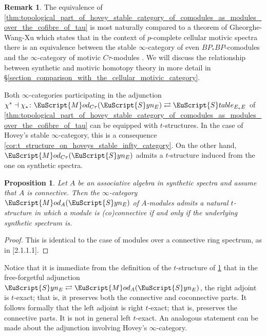 \documentclass[oneside,a4paper]{amsart}
\newcommand{\euscr}[1]{\EuScript{#1}} %
\newcommand{\stableE}{\euscr{S}table_{E_{*}E}} %
\newcommand{\synspectra}{\euscr{S}yn} %
\newcommand{\Mod}{\euscr{M}od} %
\theoremstyle{plain}
\newtheorem{prop}[thm]{Proposition}
\theoremstyle{definition}
\newtheorem{rem}[thm]{Remark}
\theoremstyle{remark}
\begin{document}
\begin{rem}
The equivalence of \cref{thm:topological_part_of_hovey_stable_category_of_comodules_as_modules_over_the_cofibre_of_tau} is most naturally compared to a theorem of Gheorghe-Wang-Xu which states that in the context of $p$-complete cellular motivic spectra there is an equivalence between the stable $\infty$-category of even $BP_{*}BP$-comodules and the $\infty$-category of motivic $C\tau$-modules \cite{gheorghe2018special}. We will discuss the relationship between synthetic and motivic homotopy theory in more detail in \S\ref{section_comparison_with_the_cellular_motivic_category}. 
\end{rem}

Both $\infty$-categories participating in the adjunction $\chi^{*} \dashv \chi_{*} \colon \Mod_{C\tau}(\synspectra_{E}) \rightleftarrows \stableE$ of  \cref{thm:topological_part_of_hovey_stable_category_of_comodules_as_modules_over_the_cofibre_of_tau} can be equipped with $t$-structures. In the case of Hovey's stable $\infty$-category, this is a consequence \cref{cor:t_structure_on_hoveys_stable_infty_category}. On the other hand, $\Mod_{C\tau}(\synspectra_{E})$ admits a $t$-structure induced from the one on synthetic spectra. 

\begin{prop}
\label{prop:a_t_structure_on_modules_in_synthetic_spectra}
Let $A$ be an associative algebra in synthetic spectra and assume that $A$ is connective. Then the $\infty$-category $\Mod_{A}(\synspectra_{E})$ of $A$-modules admits a natural $t$-structure in which a module is (co)connective if and only if the underlying synthetic spectrum is. 
\end{prop}

\begin{proof}
This is identical to the case of modules over a connective ring spectrum, as in \cite{lurie_spectral_algebraic_geometry}[2.1.1.1]. 
\end{proof}

Notice that it is immediate from the definition of the $t$-structure of \cref{prop:a_t_structure_on_modules_in_synthetic_spectra} that in the free-forgetful adjunction $\synspectra_{E} \rightleftarrows \Mod_{A}(\synspectra_{E})$, the right adjoint is $t$-exact; that is, it preserves both the connective and coconnective parts. It follows formally that the left adjoint is right $t$-exact; that is, preserves the connective parts. It is not in general left $t$-exact. An analogous statement can be made about the adjunction involving Hovey's $\infty$-category. 
\end{document}
